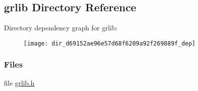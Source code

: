 \subsection{grlib Directory Reference}
\label{dir_d69152ae96e57d68f6209a92f269889f}
Directory dependency graph for grlib\+:
\nopagebreak
\begin{figure}[H]
\begin{center}
\leavevmode
\texttt{[image: dir\_d69152ae96e57d68f6209a92f269889f\_dep]}
\end{center}
\end{figure}
\subsubsection*{Files}
\begin{DoxyCompactItemize}
\item 
file \hyperlink{grlib_8h}{grlib.\+h}
\end{DoxyCompactItemize}

